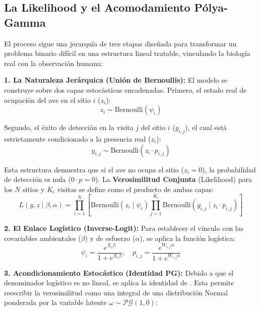 \documentclass[twocolumn,10pt]{article}
\begin{document}
\subsection{La Likelihood y el Acomodamiento Pólya-Gamma}

El proceso sigue una jerarquía de tres etapas diseñada para transformar un problema binario difícil en una estructura lineal tratable, vinculando la biología real con la observación humana:

\textbf{1. La Naturaleza Jerárquica (Unión de Bernoullis):} El modelo se construye sobre dos capas estocásticas encadenadas. Primero, el estado real de ocupación del ave en el sitio $i$ ($z_i$):
\begin{equation}
   z_i \sim \text{Bernoulli}(\psi_i)
\end{equation}

Segundo, el éxito de detección en la visita $j$ del sitio $i$ ($y_{i,j}$), el cual está estrictamente condicionado a la presencia real ($z_i$):
\begin{equation}
   y_{i,j} \sim \text{Bernoulli}(z_i \cdot p_{i,j})
\end{equation}

Esta estructura demuestra que si el ave no ocupa el sitio ($z_i=0$), la probabilidad de detección es nula ($0 \cdot p = 0$). La \textbf{Verosimilitud Conjunta} (Likelihood) para los $N$ sitios y $K_i$ visitas se define como el producto de ambas capas:
\begin{equation}
  L\!\left(y, z \mid \beta, \alpha\right) = \prod_{i=1}^N \left[ \text{Bernoulli}(z_i \mid \psi_i) \prod_{j=1}^{K_i} \text{Bernoulli}(y_{i,j} \mid z_i \cdot p_{i,j}) \right]
  \label{eq:likelihood_joint}
\end{equation}

\textbf{2. El Enlace Logístico (Inverse-Logit):} Para establecer el vínculo con las covariables ambientales ($\beta$) y de esfuerzo ($\alpha$), se aplica la función logística:
\begin{equation}
  \psi_i = \frac{e^{X_i\beta}}{1 + e^{X_i\beta}}, \quad p_{i,j} = \frac{e^{W_{i,j}\alpha}}{1 + e^{W_{i,j}\alpha}}
\end{equation}

\textbf{3. Acondicionamiento Estocástico (Identidad PG):} Debido a que el denominador logístico es no lineal, se aplica la identidad de \cite{polson2013}. Esta permite reescribir la verosimilitud como una integral de una distribución Normal ponderada por la variable latente $\omega \sim \mathcal{PG}(1, 0)$:
\end{document}
